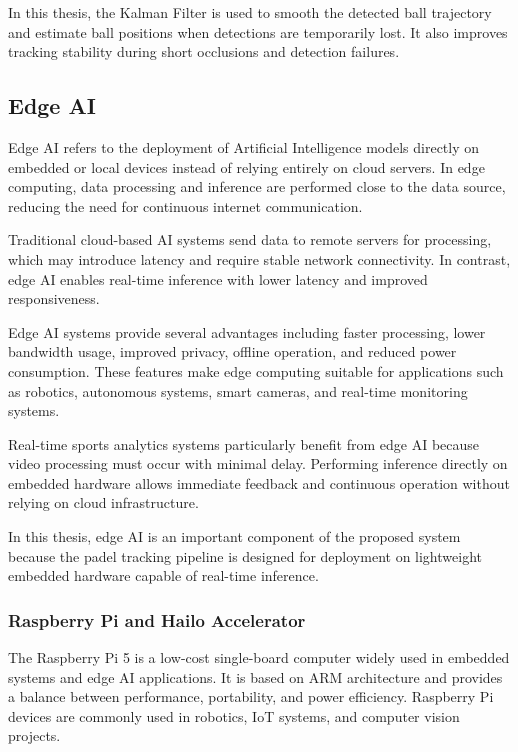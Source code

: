In this thesis, the Kalman Filter is used to smooth the detected ball trajectory and estimate ball positions when detections are temporarily lost. It also improves tracking stability during short occlusions and detection failures.

\subsection{Edge AI}

Edge AI refers to the deployment of Artificial Intelligence models directly on embedded or local devices instead of relying entirely on cloud servers. In edge computing, data processing and inference are performed close to the data source, reducing the need for continuous internet communication.

Traditional cloud-based AI systems send data to remote servers for processing, which may introduce latency and require stable network connectivity. In contrast, edge AI enables real-time inference with lower latency and improved responsiveness.

Edge AI systems provide several advantages including faster processing, lower bandwidth usage, improved privacy, offline operation, and reduced power consumption. These features make edge computing suitable for applications such as robotics, autonomous systems, smart cameras, and real-time monitoring systems.

Real-time sports analytics systems particularly benefit from edge AI because video processing must occur with minimal delay. Performing inference directly on embedded hardware allows immediate feedback and continuous operation without relying on cloud infrastructure.

In this thesis, edge AI is an important component of the proposed system because the padel tracking pipeline is designed for deployment on lightweight embedded hardware capable of real-time inference.

\subsubsection{Raspberry Pi and Hailo Accelerator}

The Raspberry Pi 5 is a low-cost single-board computer widely used in embedded systems and edge AI applications. It is based on ARM architecture and provides a balance between performance, portability, and power efficiency. Raspberry Pi devices are commonly used in robotics, IoT systems, and computer vision projects.

